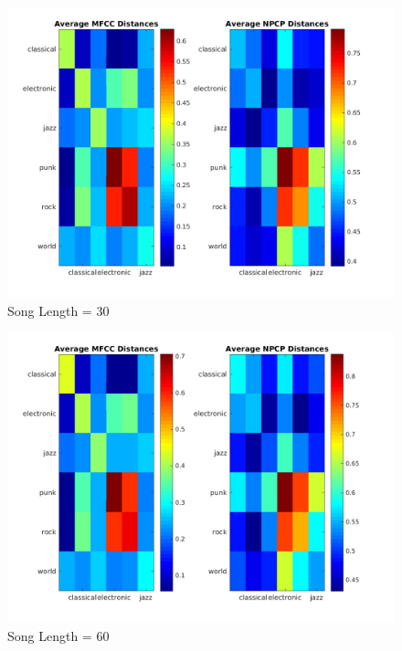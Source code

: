 \documentclass[11pt, a4paper]{article}
\begin{document}
\begin{figure}[H]
\hspace*{-2cm}    
    \centering
    \includegraphics[width=1.25\textwidth]{length30.png}
    \caption{Song Length = 30}
\end{figure}


\begin{figure}[H]
\hspace*{-2cm}    
    \centering
    \includegraphics[width=1.25\textwidth]{length60.png}
    \caption{Song Length = 60}
\end{figure}
\end{document}
